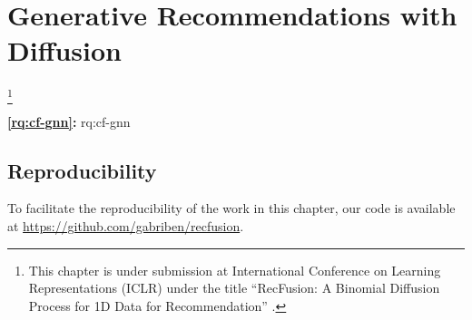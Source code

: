 
\acresetall

\chapter{Generative Recommendations with Diffusion}
\label{chapter:research-cfgnn}

\footnote[]{This chapter is under submission at International Conference on Learning Representations (ICLR) under the title ``RecFusion: A Binomial Diffusion Process for 1D Data for Recommendation'' \citep{lucic2021cfgnnexplainer}.}
\acresetall


\medskip
\noindent
\textbf{\ref{rq:cf-gnn}:} \acl{rq:cf-gnn}
\medskip

\noindent




%
%
%
%
%
%
%
%
%



\section*{Reproducibility}
To facilitate the reproducibility of the work in this chapter, our code is available at \url{https://github.com/gabriben/recfusion}.








